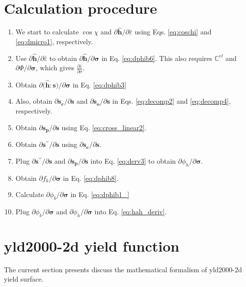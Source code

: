 \documentclass[12pt]{amsart}
\begin{document}
\section{Calculation procedure}
\label{sec:prc}
\begin{enumerate}[1)]
\item We start to calculate $\cos\chi$ and $\partial \hat{\mathbf{h}}/\partial \bar{\varepsilon}$ using Eqs. \ref{eq:coschi} and \ref{eq:dmicro1}, respectively.
\item Use $\partial \hat{\mathbf{h}}/\partial \bar{\varepsilon}$ to obtain $\partial \hat{\mathbf{h}}/\partial \mathbf{\sigma}$ in Eq. \ref{eq:dphib6}. This also requires $\mathbb{C}^{el}$ and $\partial\Phi/\partial\mathbf{\sigma}$, which gives $\frac{\partial\bar{\varepsilon}}{\partial\sigma}$.
\item Obtain $\partial\big(\hat{\mathbf{h}}:\mathbf{s}\big)/\partial \mathbf{\sigma}$ in Eq. \ref{eq:dphib3}
\item Also, obtain $\partial \mathbf{s_c}/\partial \mathbf{s}$ and $\partial \mathbf{s_o}/\partial\mathbf{s}$ in Eqs. \ref{eq:decomp2} and \ref{eq:decomp4}, respectively.
\item Obtain $\partial \mathbf{s_p}/\partial\mathbf{s}$ using Eq. \ref{eq:cross_linear2}.
\item Obtain $\partial\mathbf{s}^{\prime\prime}/\partial\mathbf{s}$ using $\partial \mathbf{s_c}/\partial \mathbf{s}$.
\item Plug $\partial\mathbf{s}^{\prime\prime}/\partial\mathbf{s}$ and  $\partial \mathbf{s_p}/\partial\mathbf{s}$ into Eq. \ref{eq:derv3} to obtain $\partial\phi_h/\partial\mathbf{\sigma}$.
\item Obtain $\partial f_k/\partial \mathbf{\sigma}$ in Eq. \ref{eq:dphib8}.
\item Calculate $\partial \phi_b/\partial \mathbf{\sigma}$ in Eq. \ref{eq:dphib1_}
\item Plug $\partial \phi_b/\partial\mathbf{\sigma}$ and $\partial\phi_h/\partial\mathbf{\sigma}$ into Eq. \ref{eq:hah_deriv}.
\end{enumerate}


\newpage
\section{yld2000-2d yield function}
The current section presents discuss the mathematical formalism of yld2000-2d yield surface.
\end{document}
